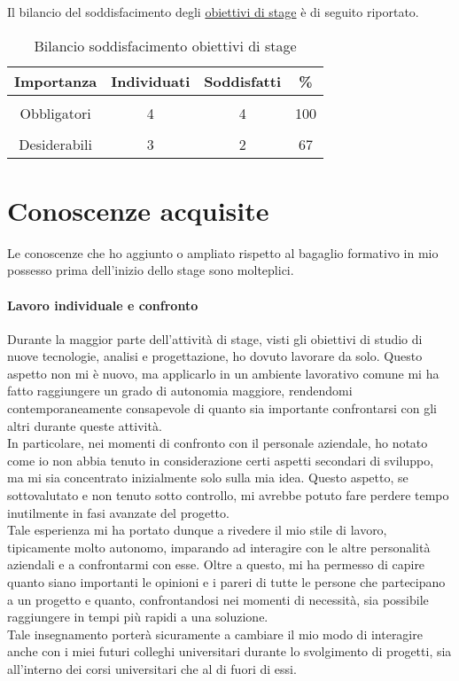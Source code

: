 Il bilancio del soddisfacimento degli \hyperref[obiettivi_stage]{obiettivi di stage} è di seguito riportato.
\begin{table}[!h] %
	\caption{Bilancio soddisfacimento obiettivi di stage}
	\label{tab:bilancio-app}
	\centering
	\begin{tabular}{ c | c | c | c}
		\textbf{Importanza} & \textbf{Individuati} & \textbf{Soddisfatti} & \textbf{\%}\\
		\hline
		\hline
		\\[-2.5mm]
		Obbligatori & 4 & 4 & 100 \\
		\hline
		\\[-2.5mm]
		Desiderabili & 3 & 2 & 67 \\
		\hline
	\end{tabular}
\end{table}%

\section{Conoscenze acquisite}
Le conoscenze che ho aggiunto o ampliato rispetto al bagaglio formativo in mio possesso prima dell'inizio dello stage sono molteplici.

\paragraph{Lavoro individuale e confronto}
Durante la maggior parte dell'attività di stage, visti gli obiettivi di studio di nuove tecnologie, analisi e progettazione, ho dovuto lavorare da solo. Questo aspetto non mi è nuovo, ma applicarlo in un ambiente lavorativo comune mi ha fatto raggiungere un grado di autonomia maggiore, rendendomi contemporaneamente consapevole di quanto sia importante confrontarsi con gli altri durante queste attività. \\
In particolare, nei momenti di confronto con il personale aziendale, ho notato come io non abbia tenuto in considerazione certi aspetti secondari di sviluppo, ma mi sia concentrato inizialmente solo sulla mia idea. Questo aspetto, se sottovalutato e non tenuto sotto controllo, mi avrebbe potuto fare perdere tempo inutilmente in fasi avanzate del progetto.\\
Tale esperienza mi ha portato dunque a rivedere il mio stile di lavoro, tipicamente molto autonomo, imparando ad interagire con le altre personalità aziendali e a confrontarmi con esse. Oltre a questo, mi ha permesso di capire quanto siano importanti le opinioni e i pareri di tutte le persone che partecipano a un progetto e quanto, confrontandosi nei momenti di necessità, sia possibile raggiungere in tempi più rapidi a una soluzione. \\
Tale insegnamento porterà sicuramente a cambiare il mio modo di interagire anche con i miei futuri colleghi universitari durante lo svolgimento di progetti, sia all'interno dei corsi universitari che al di fuori di essi.

